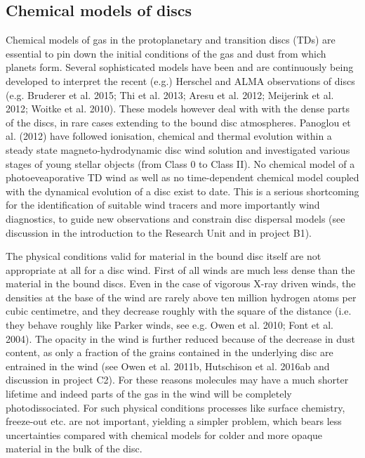 \documentclass[10pt,fleqn,twoside]{article}
\begin{document}
\subsection{Chemical models of discs}

Chemical models of gas in the protoplanetary and transition discs (TDs) are essential to pin down the initial conditions of the gas and dust from which planets form. Several sophisticated models have been and are continuously being developed to interpret the recent (e.g.) Herschel and ALMA observations of discs (e.g. Bruderer et al. 2015; Thi et al. 2013; Aresu et al. 2012; Meijerink et al. 2012; Woitke et al. 2010). These models however deal with with the dense parts of the discs, in rare cases extending to the bound disc atmospheres. Panoglou et al. (2012) have followed ionisation, chemical and thermal evolution within a steady state magneto-hydrodynamic disc wind solution and investigated various stages of young stellar objects (from Class 0 to Class II).  No chemical model of a photoeveaporative TD wind as well as no time-dependent chemical model coupled with the dynamical evolution of a disc exist to date. This is a serious shortcoming for the identification of suitable wind tracers and more importantly wind diagnostics, to guide new observations and constrain disc dispersal models (see discussion in the introduction to the Research Unit and in project B1). 

The physical conditions valid for material in the bound disc itself are not appropriate at all for a disc wind. First of all winds are much less dense than the material in the bound discs. Even in the case of vigorous X-ray driven winds, the densities at the base of the wind are rarely above ten million hydrogen atoms per cubic centimetre, and they decrease roughly with the square of the distance (i.e. they behave roughly like Parker winds, see e.g. Owen et al. 2010; Font et al. 2004). The opacity in the wind is further reduced because of the decrease in dust content, as only a fraction of the grains contained in the underlying disc are entrained in the wind (see Owen et al. 2011b, Hutschison et al. 2016ab and discussion in project C2). For these reasons molecules may have a much shorter lifetime and indeed parts of the gas in the wind will be completely photodissociated. For such physical conditions processes like surface chemistry, freeze-out etc. are not important, yielding a simpler problem, which bears less uncertainties compared with chemical models for colder and more opaque material in the bulk of the disc. 
\end{document}
